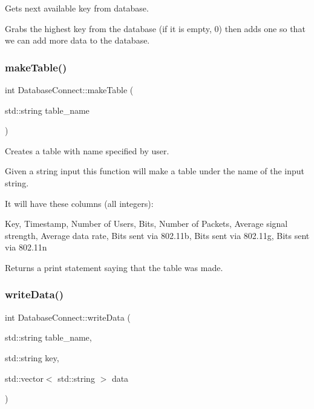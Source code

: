 Gets next available key from database. 

Grabs the highest key from the database (if it is empty, 0) then adds one so that we can add more data to the database. \mbox{\label{classDatabaseConnect_a255912a26d94bddf7b2400df4bc3fa18}} 
\subsubsection{\texorpdfstring{make\+Table()}{makeTable()}}
{\footnotesize\ttfamily int Database\+Connect\+::make\+Table (\begin{DoxyParamCaption}\item[{std\+::string}]{table\+\_\+name }\end{DoxyParamCaption})}



Creates a table with name specified by user. 

Given a string input this function will make a table under the name of the input string.

It will have these columns (all integers)\+:

Key, Timestamp, Number of Users, Bits, Number of Packets, Average signal strength, Average data rate, Bits sent via 802.\+11b, Bits sent via 802.\+11g, Bits sent via 802.\+11n

Returns a print statement saying that the table was made. \mbox{\label{classDatabaseConnect_a0bcf3c738cc1cdd85cec0498b876ad5a}} 
\subsubsection{\texorpdfstring{write\+Data()}{writeData()}}
{\footnotesize\ttfamily int Database\+Connect\+::write\+Data (\begin{DoxyParamCaption}\item[{std\+::string}]{table\+\_\+name,  }\item[{std\+::string}]{key,  }\item[{std\+::vector$<$ std\+::string $>$}]{data }\end{DoxyParamCaption})}



